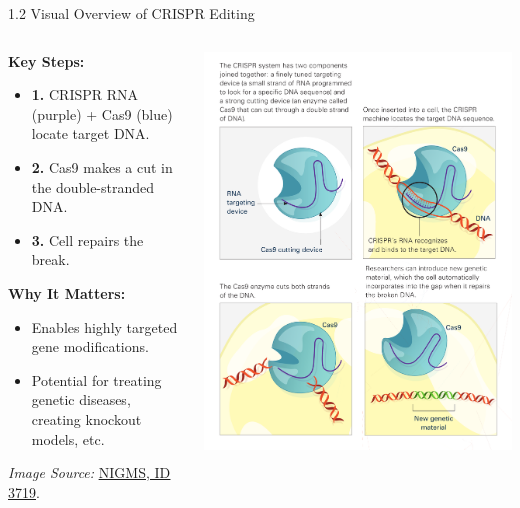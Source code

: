 \documentclass[10pt]{beamer}
\let\oldhref\href
\renewcommand{\href}[2]{\oldhref{#1}{\uline{#2}}}
\begin{document}
\begin{frame}{1.2 Visual Overview of CRISPR Editing}
  \begin{columns}
    \begin{column}{0.4\linewidth}
      \textbf{Key Steps:}
      \begin{itemize}
        \item \textbf{1.} CRISPR RNA (purple) + Cas9 (blue) locate target DNA.
        \item \textbf{2.} Cas9 makes a cut in the double-stranded DNA.
        \item \textbf{3.} Cell repairs the break. 
      \end{itemize}
      \vspace{0.3cm}
      \textbf{Why It Matters:}
      \begin{itemize}
        \item Enables highly targeted gene modifications.
        \item Potential for treating genetic diseases, creating knockout models, etc.
      \end{itemize}
      \vspace{0.3cm}
      \tiny
      \textit{Image Source:}
      \href{https://images.nigms.nih.gov/pages/DetailPage.aspx?imageid2=3719\#}{%
        NIGMS, ID 3719}.
    \end{column}
    \begin{column}{0.6\linewidth}
        \begin{center}
          \includegraphics[width=0.85\linewidth]{figs/crispr_guide.png}
      \end{center}
    \end{column}
  \end{columns}
\end{frame}
\end{document}
